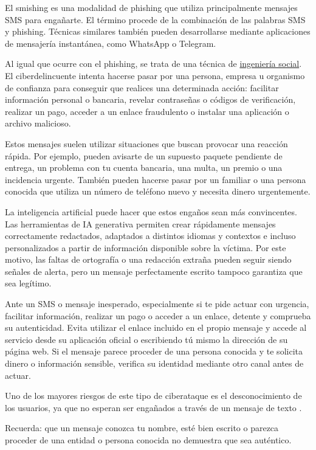 \documentclass[
  spanish,
  a4paper,
  openany]{book}
\begin{document}
El smishing es una modalidad de phishing que utiliza principalmente mensajes SMS para engañarte. El término procede de la combinación de las palabras SMS y phishing. Técnicas similares también pueden desarrollarse mediante aplicaciones de mensajería instantánea, como WhatsApp o Telegram.

Al igual que ocurre con el phishing, se trata de una técnica de \href{https://es.wikipedia.org/wiki/Ingeniería_social_(seguridad_informática)}{ingeniería social}. El ciberdelincuente intenta hacerse pasar por una persona, empresa u organismo de confianza para conseguir que realices una determinada acción: facilitar información personal o bancaria, revelar contraseñas o códigos de verificación, realizar un pago, acceder a un enlace fraudulento o instalar una aplicación o archivo malicioso.

Estos mensajes suelen utilizar situaciones que buscan provocar una reacción rápida. Por ejemplo, pueden avisarte de un supuesto paquete pendiente de entrega, un problema con tu cuenta bancaria, una multa, un premio o una incidencia urgente. También pueden hacerse pasar por un familiar o una persona conocida que utiliza un número de teléfono nuevo y necesita dinero urgentemente.

La inteligencia artificial puede hacer que estos engaños sean más convincentes. Las herramientas de IA generativa permiten crear rápidamente mensajes correctamente redactados, adaptados a distintos idiomas y contextos e incluso personalizados a partir de información disponible sobre la víctima. Por este motivo, las faltas de ortografía o una redacción extraña pueden seguir siendo señales de alerta, pero un mensaje perfectamente escrito tampoco garantiza que sea legítimo.

Ante un SMS o mensaje inesperado, especialmente si te pide actuar con urgencia, facilitar información, realizar un pago o acceder a un enlace, detente y comprueba su autenticidad. Evita utilizar el enlace incluido en el propio mensaje y accede al servicio desde su aplicación oficial o escribiendo tú mismo la dirección de su página web. Si el mensaje parece proceder de una persona conocida y te solicita dinero o información sensible, verifica su identidad mediante otro canal antes de actuar.

Uno de los mayores riesgos de este tipo de ciberataque es el desconocimiento de los usuarios, ya que no esperan ser engañados a través de un mensaje de texto \citep{INCIBE-smishing}.

Recuerda: que un mensaje conozca tu nombre, esté bien escrito o parezca proceder de una entidad o persona conocida no demuestra que sea auténtico.
\end{document}
